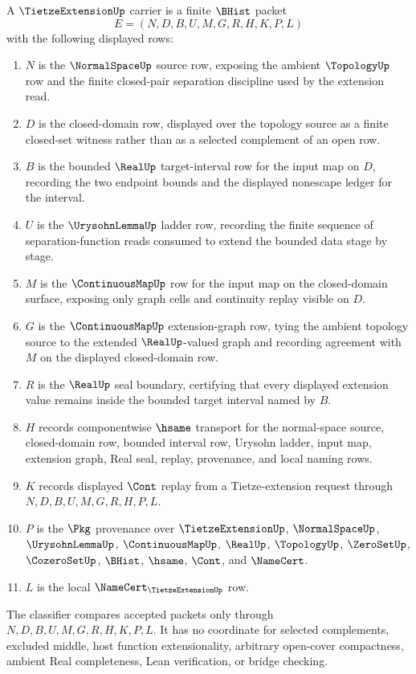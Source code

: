 \begin{definition}
\label{def:tietze-extension-carrier}
A $\TietzeExtensionUp$ carrier is a finite $\BHist$ packet
$$
E=(N,D,B,U,M,G,R,H,K,P,L)
$$
with the following displayed rows:
\begin{enumerate}
\item $N$ is the $\NormalSpaceUp$ source row, exposing the ambient $\TopologyUp$ row and the finite closed-pair separation discipline used by the extension read.
\item $D$ is the closed-domain row, displayed over the topology source as a finite closed-set witness rather than as a selected complement of an open row.
\item $B$ is the bounded $\RealUp$ target-interval row for the input map on $D$, recording the two endpoint bounds and the displayed nonescape ledger for the interval.
\item $U$ is the $\UrysohnLemmaUp$ ladder row, recording the finite sequence of separation-function reads consumed to extend the bounded data stage by stage.
\item $M$ is the $\ContinuousMapUp$ row for the input map on the closed-domain surface, exposing only graph cells and continuity replay visible on $D$.
\item $G$ is the $\ContinuousMapUp$ extension-graph row, tying the ambient topology source to the extended $\RealUp$-valued graph and recording agreement with $M$ on the displayed closed-domain row.
\item $R$ is the $\RealUp$ seal boundary, certifying that every displayed extension value remains inside the bounded target interval named by $B$.
\item $H$ records componentwise $\hsame$ transport for the normal-space source, closed-domain row, bounded interval row, Urysohn ladder, input map, extension graph, Real seal, replay, provenance, and local naming rows.
\item $K$ records displayed $\Cont$ replay from a Tietze-extension request through $N,D,B,U,M,G,R,H,P,L$.
\item $P$ is the $\Pkg$ provenance over $\TietzeExtensionUp$, $\NormalSpaceUp$, $\UrysohnLemmaUp$, $\ContinuousMapUp$, $\RealUp$, $\TopologyUp$, $\ZeroSetUp$, $\CozeroSetUp$, $\BHist$, $\hsame$, $\Cont$, and $\NameCert$.
\item $L$ is the local $\NameCert_{\TietzeExtensionUp}$ row.
\end{enumerate}
The classifier compares accepted packets only through $N,D,B,U,M,G,R,H,K,P,L$. It has no coordinate for selected complements, excluded middle, host function extensionality, arbitrary open-cover compactness, ambient Real completeness, Lean verification, or bridge checking.
\end{definition}

